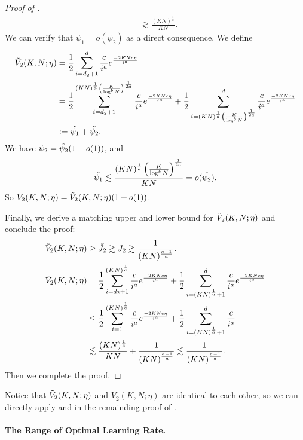 \begin{proof}[Proof of ]
\begin{align*}
    &\gtrsim \frac{(KN)^{\frac{1}{a}}}{KN}.
\end{align*}
We can verify that $\psi_1 = o(\psi_2)$ as a direct consequence.
We define 
\begin{align*}
    \Tilde{V}_2(K,N;\eta) &= \frac{1}{2}\sum_{i=d_2 + 1}^{d}\frac{c}{i^{a}}e^{\frac{-2KNc\eta}{i^{a}}} \\
    &=\frac{1}{2}\sum_{i=d_2 + 1}^{(KN)^{\frac{1}{a}}\left(\frac{K}{\log^bN}\right)^{\frac{1}{2a}}}\frac{c}{i^{a}}e^{\frac{-2KNc\eta}{i^{a}}}+\frac{1}{2}\sum_{i=(KN)^{\frac{1}{a}}\left(\frac{K}{\log^bN}\right)^{\frac{1}{2a}}}^{d}\frac{c}{i^{a}}e^{\frac{-2KNc\eta}{i^{a}}} \\
    &:=\Tilde{\psi_1}+\Tilde{\psi_2}.
\end{align*}
We have $\psi_2 = \Tilde{\psi_2}(1+o(1))$, and
\begin{align*}
    \Tilde{\psi_1}&\lesssim \frac{(KN)^{\frac{1}{a}}\left(\frac{K}{\log^bN}\right)^{\frac{1}{2a}}}{KN} = o(\Tilde{\psi_2}). \\
\end{align*}
So $V_2(K,N;\eta)=\Tilde{V}_2(K,N;\eta)(1+o(1))$.

Finally, we derive a matching upper and lower bound for $\Tilde{V}_2(K,N;\eta)$ and conclude the proof:
\begin{align*}
    \Tilde{V}_2(K,N;\eta) &\geq \Tilde{J_2} \gtrsim J_2 \gtrsim \frac{1}{(KN)^{\frac{a-1}{a}}}. \\
    \Tilde{V}_2(K,N;\eta) &=\frac{1}{2}\sum_{i=d_2 + 1}^{(KN)^{\frac{1}{a}}}\frac{c}{i^{a}}e^{\frac{-2KNc\eta}{i^{a}}}+\frac{1}{2}\sum_{i=(KN)^{\frac{1}{a}}+1}^{d}\frac{c}{i^{a}}e^{\frac{-2KNc\eta}{i^{a}}} \\
    &\leq \frac{1}{2}\sum_{i=1}^{(KN)^{\frac{1}{a}}}\frac{c}{i^{a}}e^{\frac{-2KNc\eta}{i^{a}}}+\frac{1}{2}\sum_{i=(KN)^{\frac{1}{a}}+1}^{d}\frac{c}{i^{a}} \\
    &\lesssim \frac{(KN)^{\frac{1}{a}}}{KN}+\frac{1}{\left(KN\right)^{\frac{a-1}{a}}} \lesssim \frac{1}{\left(KN\right)^{\frac{a-1}{a}}}.
\end{align*}
Then we complete the proof.
\end{proof}
Notice that $\Tilde{V}_2(K,N;\eta)$ and $V_2(K,N;\eta)$ are identical to each other, so we can directly apply  and  in the remainding proof of .

\paragraph{The Range of Optimal Learning Rate.}

